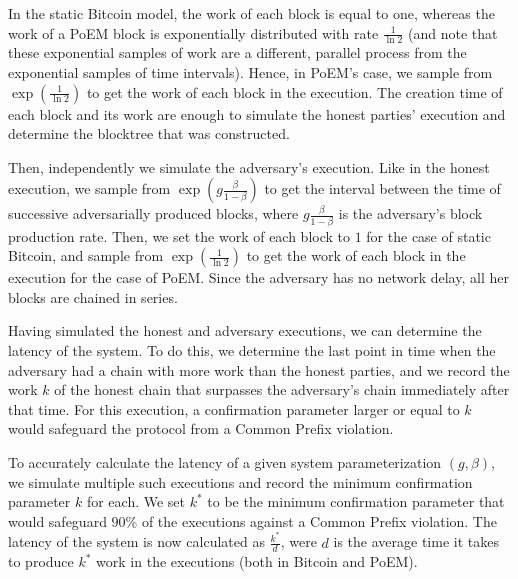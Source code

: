 In the static Bitcoin model, the work of each block is equal to one,
whereas the work of a PoEM block is exponentially
distributed with rate $\frac{1}{\ln2}$ (and note that these exponential samples of work are a different, parallel process
from the exponential samples of time intervals). Hence, in PoEM's case, we sample from $\exp(\frac{1}{\ln2})$ to get the work
of each block in the execution. The creation time of each block and its work are enough to simulate the honest parties' execution
and determine the blocktree that was constructed.

Then, independently we simulate the adversary's execution. Like in the honest execution, we sample from $\exp(g\frac{\beta}{1 - \beta})$
to get the interval between the time of successive adversarially produced blocks, where $g\frac{\beta}{1 - \beta}$ is the adversary's block production rate.
Then, we set the work of each block to $1$ for the case of static Bitcoin, and sample from $\exp(\frac{1}{\ln2})$ to get the work of each block in the execution for the case of PoEM.
Since the adversary has no network delay, all her blocks are chained in series.

Having simulated the honest and adversary executions, we can determine the latency of the system.
To do this, we determine the last point in time when the adversary had a chain with more work than the honest parties,
and we record the work $k$ of the honest chain that surpasses the adversary's chain immediately after that time.
For this execution, a confirmation parameter larger or equal to $k$ would safeguard the protocol from a Common Prefix violation.

To accurately calculate the latency of a given system parameterization $(g, \beta)$, we simulate multiple such executions and record the minimum confirmation
parameter $k$ for each. We set $k^*$ to be the minimum confirmation parameter that would safeguard $90\%$ of the executions against a Common Prefix violation.
The latency of the system is now calculated as $\frac{k^*}{d}$, were $d$ is the average time it takes to produce $k^*$ work in the executions
(both in Bitcoin and PoEM).

